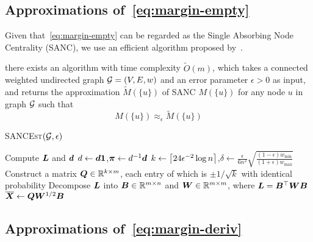 \documentclass[sigconf]{acmart}
\begin{document}
\subsection{Approximations of~\eqref{eq:margin-empty}}

Given that~\eqref{eq:margin-empty} can be regarded as the Single Absorbing Node Centrality (SANC), we use an efficient algorithm proposed by~\cite{ZhXuZh20}.
\begin{lemma}\label{lem:approxhk}
    there exists an algorithm with time complexity \(\tilde{O}(m)\), which takes a connected weighted undirected graph \(\mathcal{G}=(V,E,w)\) and an error parameter \(\epsilon>0\) as input, and returns the approximation \(\tilde{M}(\{u\})\) of SANC \(M(\{u\})\) for any node \(u\) in graph \(\mathcal{G}\) such that
    \[M(\{u\})\approx_\epsilon\tilde{M}(\{u\})\]
\end{lemma}

\begin{algorithm}
    \caption{\textsc{SANCEst}\((\mathcal{G},\epsilon)\)}
    \label{algo:sancest}
    Compute \(\boldsymbol{L}\) and \(\boldsymbol{d}\)\;
    \(d\gets\boldsymbol{d}\boldsymbol{1}\),\(\boldsymbol{\pi}\gets d^{-1}\boldsymbol{d}\)\;
    \(k\gets\left\lceil24\epsilon^{-2}\log n\right\rceil\),\(\delta\gets\frac{\epsilon}{6n^2}\sqrt{\frac{(1-\epsilon)w_{\min}}{(1+\epsilon)w_{\max}}}\)\;
    Construct a matrix \(\boldsymbol{Q}\in\mathbb{R}^{k\times m}\), each entry of which is \(\pm1/\sqrt k\) with identical probability\;
    Decompose \(\boldsymbol{L}\) into \(\boldsymbol{B}\in\mathbb{R}^{m\times n}\) and \(\boldsymbol{W}\in\mathbb{R}^{m\times m}\), where \(\boldsymbol{L}=\boldsymbol{B}^\top\boldsymbol{W}\boldsymbol{B}\)\;
    \(\overline{\boldsymbol{X}}\gets\boldsymbol{Q}\boldsymbol{W}^{1/2}\boldsymbol{B}\)\;

\end{algorithm}

\subsection{Approximations of~\eqref{eq:margin-deriv}}
\end{document}
